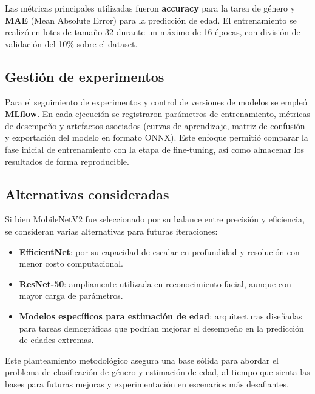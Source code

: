 Las métricas principales utilizadas fueron \textbf{accuracy} para la tarea de género y \textbf{MAE} (Mean Absolute Error) para la predicción de edad. El entrenamiento se realizó en lotes de tamaño 32 durante un máximo de 16 épocas, con división de validación del 10\% sobre el dataset.

\subsection{Gestión de experimentos}
Para el seguimiento de experimentos y control de versiones de modelos se empleó \textbf{MLflow}. En cada ejecución se registraron parámetros de entrenamiento, métricas de desempeño y artefactos asociados (curvas de aprendizaje, matriz de confusión y exportación del modelo en formato ONNX). Este enfoque permitió comparar la fase inicial de entrenamiento con la etapa de fine-tuning, así como almacenar los resultados de forma reproducible.

\subsection{Alternativas consideradas}
Si bien MobileNetV2 fue seleccionado por su balance entre precisión y eficiencia, se consideran varias alternativas para futuras iteraciones:
\begin{itemize}
  \item \textbf{EfficientNet}: por su capacidad de escalar en profundidad y resolución con menor costo computacional.
  \item \textbf{ResNet-50}: ampliamente utilizada en reconocimiento facial, aunque con mayor carga de parámetros.
  \item \textbf{Modelos específicos para estimación de edad}: arquitecturas diseñadas para tareas demográficas que podrían mejorar el desempeño en la predicción de edades extremas.
\end{itemize}

Este planteamiento metodológico asegura una base sólida para abordar el problema de clasificación de género y estimación de edad, al tiempo que sienta las bases para futuras mejoras y experimentación en escenarios más desafiantes.
